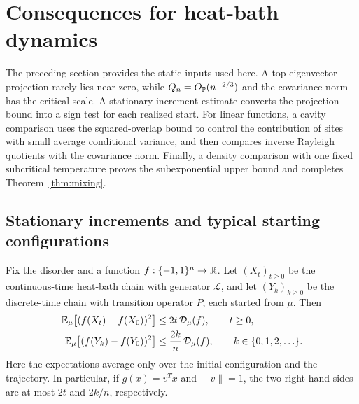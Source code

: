 \section{Consequences for heat-bath dynamics}\label{sec:dynamics}

The preceding section provides the static inputs used here. A top-eigenvector
projection rarely lies near zero, while $Q_n=O_{\mathbb P}(n^{-2/3})$ and the
covariance norm has the critical scale. A stationary increment estimate
converts the projection bound into a sign test for each realized start.
For linear functions, a cavity comparison uses the squared-overlap bound
to control the contribution of sites with small average conditional variance,
and then compares inverse Rayleigh quotients with the covariance norm.
Finally, a density comparison with one fixed subcritical temperature proves
the subexponential upper bound and completes Theorem~\ref{thm:mixing}.

\subsection{Stationary increments and typical starting configurations}

\begin{lemma}\label{lem:stationary-increments}
Fix the disorder and a function $f:\{-1,1\}^n\to\mathbb R$.
Let $(X_t)_{t\ge0}$ be the continuous-time heat-bath chain with generator
$\mathcal L$, and let $(Y_k)_{k\ge0}$ be the discrete-time chain with
transition operator $P$, each started from $\mu$.  Then
\begin{align}
 \mathbb E_\mu\bigl[(f(X_t)-f(X_0))^2\bigr]
 &\le 2t\,\mathcal D_\mu(f), \qquad t\ge0,\label{eq:stationary-increments-ct}\\
 \mathbb E_\mu\bigl[(f(Y_k)-f(Y_0))^2\bigr]
 &\le \frac{2k}{n}\,\mathcal D_\mu(f),
 \qquad k\in\{0,1,2,\ldots\}.\label{eq:stationary-increments-dt}
\end{align}
Here the expectations average only over the initial configuration and
the trajectory.  In particular, if $g(x)=v^Tx$ and $\|v\|=1$, the two
right-hand sides are at most $2t$ and $2k/n$, respectively.
\end{lemma}

